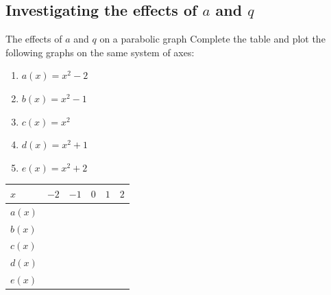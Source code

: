 \subsection*{Investigating the effects of $a$ and $q$ }
\begin{Investigation}{The effects of $a$ and $q$ on a parabolic graph}
Complete the table and plot the following graphs on the same system of axes:
    \begin{enumerate}[noitemsep, label=\textbf{\arabic*}. ] 
  \item $a(x)={x}^{2}-2$
    \item $b(x)={x}^{2}-1$
    \item $c(x)={x}^{2}$
    \item $d(x)={x}^{2}+1$
    \item $e(x)={x}^{2}+2$
        \end{enumerate}

\begin{table}[H]
\begin{center}

\noindent

\begin{tabular}{|l|l|l|l|l|l|}\hline
 $x$&
$-2$&
$-1$&
$0$&
$1$&
$2$
\\ \hline


$a(x)$
&
&
&
&
&
\\ \hline

$b(x)$
&
&
&
&
&
\\ \hline

$c(x)$
&
&
&
&
&
\\ \hline

$d(x)$
&
&
&
&
&
\\ \hline

$e(x)$
&
&
&
&
&
\\ \hline


\end{tabular}
\end{center}
\end{table}
\end{Investigation}
